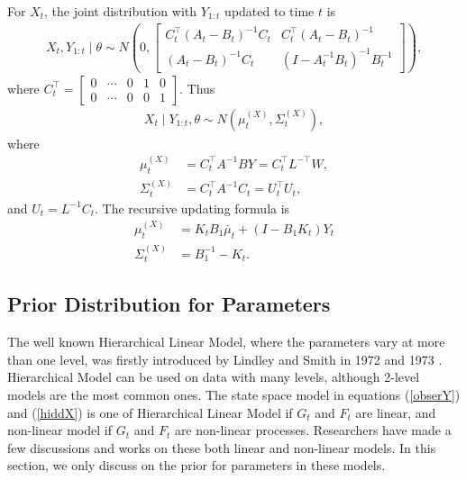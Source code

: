 For $X_{t}$, the joint distribution with $Y_{1:t}$ updated to time $t$ is 
\begin{align*}
X_{t}, Y_{1:t} \mid \theta \sim N\left( 0, \begin{bmatrix}
C_{t}^\top(A_{t}-B_{t}) ^{-1}C_{t} & C_{t}^\top (A_{t}-B_{t})^{-1}\\
(A_{t}-B_{t})^{-1}C_{t} & (I- A_{t}^{-1}B_{t}) ^{-1}B_{t}^{-1}
\end{bmatrix} \right),
\end{align*}
where $C_{t}^\top=\begin{bmatrix}
0 & \cdots & 0 & 1 & 0 \\ 0 & \cdots & 0 & 0 & 1 
\end{bmatrix}$. Thus 
\begin{align*}
X_{t}\mid Y_{1:t},\theta \sim N(\mu_{t}^{(X)},\Sigma_{t}^{(X)}),
\end{align*}
where
\begin{align*}
\mu_{t}^{(X)} & = C_{t}^\top A^{-1}BY =C_{t}^\top L^{-\top}W,\\
\Sigma_{t}^{(X)} & =C_{t}^\top A^{-1}C_{t} =U_{t}^\top U_{t},
\end{align*}
and $U_{t} = L^{-1} C_{t}$.
The recursive updating formula is  
\begin{align}
\mu_{t}^{(X)}  &=  K_{t}B_1\bar{\mu}_{t} + (I - B_1K_{t})Y_{t}  \\
\Sigma_{t}^{(X)}  &=B_1^{-1}-K_{t}.
\end{align}





\subsection{Prior Distribution for Parameters}

The well known Hierarchical Linear Model, where the parameters vary at more than one level, was firstly introduced by Lindley and Smith in 1972 and 1973 \cite{lindley1972bayes} \cite{smith1973general}. Hierarchical Model can be used on data with many levels, although 2-level models are the most common ones. The state space model in equations (\ref{obserY}) and (\ref{hiddX}) is one of Hierarchical Linear Model if $G_t$ and $F_t$ are linear, and non-linear model if $G_t$ and $F_t$ are non-linear processes. Researchers have made a few discussions and works on these both linear and non-linear models. In this section, we only discuss on the prior for parameters in these models. 

